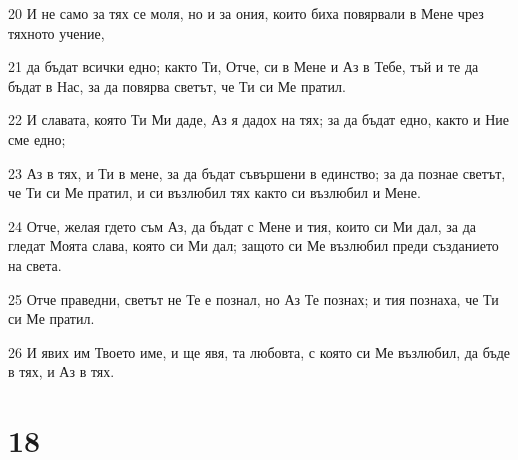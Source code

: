 \par 20 И не само за тях се моля, но и за ония, които биха повярвали в Мене чрез тяхното учение,
\par 21 да бъдат всички едно; както Ти, Отче, си в Мене и Аз в Тебе, тъй и те да бъдат в Нас, за да повярва светът, че Ти си Ме пратил.
\par 22 И славата, която Ти Ми даде, Аз я дадох на тях; за да бъдат едно, както и Ние сме едно;
\par 23 Аз в тях, и Ти в мене, за да бъдат съвършени в единство; за да познае светът, че Ти си Ме пратил, и си възлюбил тях както си възлюбил и Мене.
\par 24 Отче, желая гдето съм Аз, да бъдат с Мене и тия, които си Ми дал, за да гледат Моята слава, която си Ми дал; защото си Ме възлюбил преди създанието на света.
\par 25 Отче праведни, светът не Те е познал, но Аз Те познах; и тия познаха, че Ти си Ме пратил.
\par 26 И явих им Твоето име, и ще явя, та любовта, с която си Ме възлюбил, да бъде в тях, и Аз в тях.

\chapter{18}

